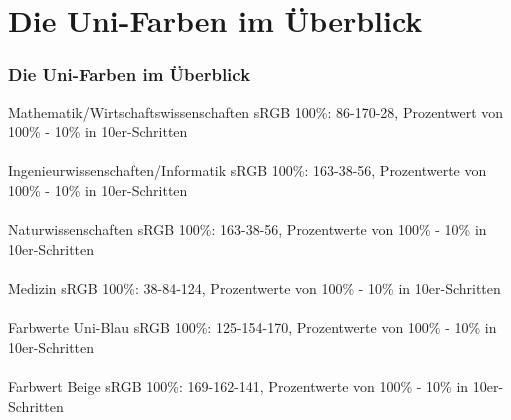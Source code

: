 \documentclass[aspectratio=169]{beamer}
\begin{document}
\section{Die Uni-Farben im \"{U}berblick}
\begin{frame}
 \frametitle{Die Uni-Farben im \"{U}berblick}
 \vspace{-0.1cm}
\hspace{-0.75cm}  \tiny{Mathematik/Wirtschaftswissenschaften sRGB 100\%: 86-170-28, Prozentwert von 100\% - 10\% in 10er-Schritten} \\
\hspace{-0.7cm}  \colorbox{farbwert-mawi}{}{} \\
 \vspace{0.5cm}
\hspace{-0.7cm}  \tiny{Ingenieurwissenschaften/Informatik sRGB 100\%: 163-38-56, Prozentwerte von 100\% - 10\% in 10er-Schritten} \\
\hspace{-0.7cm}  \colorbox{farbwert-inwiin}{}{} \\
  \vspace{0.5cm}
\hspace{-0.7cm}  \tiny{Naturwissenschaften sRGB 100\%: 163-38-56, Prozentwerte von 100\% - 10\% in 10er-Schritten} \\
\hspace{-0.7cm}  \colorbox{farbwert-nawi}{}{} \\
   \vspace{0.5cm}
   \hspace{-0.7cm}  \tiny{Medizin sRGB 100\%: 38-84-124, Prozentwerte von 100\% - 10\% in 	       10er-Schritten} \\
\hspace{-0.7cm}  \colorbox{farbwert-med-blau}{}{}  \\
  \vspace{0.5cm}
\hspace{-0.7cm}  \tiny{Farbwerte Uni-Blau sRGB 100\%: 125-154-170, Prozentwerte von 100\% - 10\% in 	       10er-Schritten} \\
\hspace{-0.7cm}  \colorbox{farbwert-blau}{}{}  \\
  \vspace{0.5cm}
  \hspace{-0.7cm}  \tiny{Farbwert Beige sRGB 100\%: 169-162-141, Prozentwerte von 100\% - 10\% in 10er-Schritten} \\
\hspace{-0.7cm}  \colorbox{farbwert-beige}{}{} \\
  \vspace{0.5cm}
\end{frame}
\end{document}
